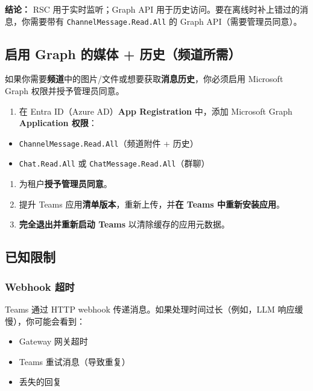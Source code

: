 \textbf{结论：} RSC 用于实时监听；Graph API 用于历史访问。要在离线时补上错过的消息，你需要带有 \texttt{ChannelMessage.Read.All} 的 Graph API（需要管理员同意）。

\subsection{启用 Graph 的媒体 + 历史（频道所需）}


如果你需要\textbf{频道}中的图片/文件或想要获取\textbf{消息历史}，你必须启用 Microsoft Graph 权限并授予管理员同意。

\begin{enumerate}
  \item 在 Entra ID（Azure AD）\textbf{App Registration} 中，添加 Microsoft Graph \textbf{Application 权限}：
\end{enumerate}

\begin{itemize}
  \item \texttt{ChannelMessage.Read.All}（频道附件 + 历史）
  \item \texttt{Chat.Read.All} 或 \texttt{ChatMessage.Read.All}（群聊）
\end{itemize}

\begin{enumerate}
  \item 为租户\textbf{授予管理员同意}。
  \item 提升 Teams 应用\textbf{清单版本}，重新上传，并\textbf{在 Teams 中重新安装应用}。
  \item \textbf{完全退出并重新启动 Teams} 以清除缓存的应用元数据。
\end{enumerate}


\subsection{已知限制}


\subsubsection{Webhook 超时}


Teams 通过 HTTP webhook 传递消息。如果处理时间过长（例如，LLM 响应缓慢），你可能会看到：

\begin{itemize}
  \item Gateway 网关超时
  \item Teams 重试消息（导致重复）
  \item 丢失的回复
\end{itemize}


